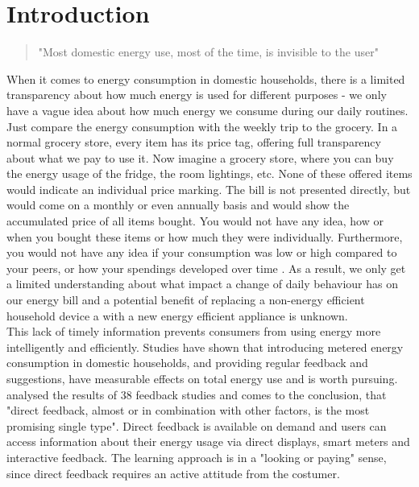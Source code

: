 
\chapter{Introduction}
\label{ch:Introduction}

\begin{quotation}
"Most domestic energy use, most of the time, is invisible to the user" 
\begin{flushright}
\cite{Darby2006}
\end{flushright}
\end{quotation}

When it comes to energy consumption in domestic households, there is a limited transparency about how much energy is used for different purposes - we only have a vague idea about how much energy we consume during our daily routines. Just compare the energy consumption with the weekly trip to the grocery. In a normal grocery store, every item has its price tag, offering full transparency about what we pay to use it. Now imagine a grocery store, where you can buy the energy usage of the fridge, the room 
lightings, etc. None of these offered items would indicate an individual price marking. The bill is not presented directly, but would come on a monthly or even annually basis and would show the accumulated price of all items bought. You would not have any idea, how or when you bought these items or how much they were individually. Furthermore, you would not have any idea if your consumption was low or high compared to your peers, or how your spendings developed over time  \citep{Kempton1994}. As a result, we only get a limited understanding about what impact a change of daily behaviour has on our energy bill  \citep{Darby2006} and a potential benefit of replacing a non-energy efficient household device a with a new energy efficient appliance is unknown.\\
This lack of timely information prevents consumers from using energy more intelligently and efficiently\citep{Darby2000}.
Studies have shown that introducing metered energy consumption in domestic households, and providing regular feedback and suggestions, have measurable effects on total energy use and is worth pursuing.  
 \cite{Darby2000} analysed the results of 38 feedback studies and comes to the conclusion, that "direct feedback, almost or in combination with other factors, is the most promising single type". Direct feedback is available on demand and users can access information about their energy usage via direct displays, smart meters and interactive feedback. The learning approach is in a "looking or paying" sense, since direct feedback requires an active attitude from the costumer.

